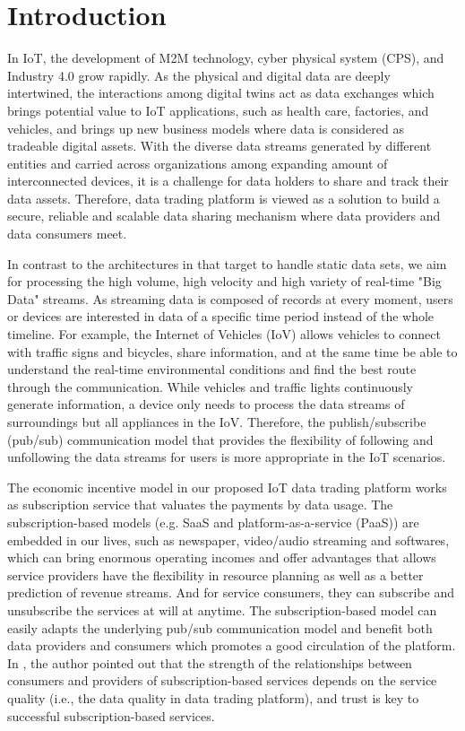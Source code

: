 \documentclass[conference]{IEEEtran}
\begin{document}
\section{Introduction}
In IoT, the development of M2M technology\cite{M2M}, cyber physical system (CPS)\cite{CPS}, and Industry 4.0 grow rapidly. As the physical and digital data are deeply intertwined, the interactions among digital twins act as data exchanges\cite{digitaltwin} which brings potential value to IoT applications, such as health care\cite{healthCare}, factories, and vehicles\cite{AutonomousDriving}, and brings up new business models where data is considered as tradeable digital assets. With the diverse data streams generated by different entities and carried across organizations among expanding amount of interconnected devices, it is a challenge for data holders to share and track their data assets. Therefore, data trading platform is viewed as a solution to build a secure, reliable and scalable data sharing mechanism where data providers and data consumers meet.

In contrast to the architectures in \cite{DIaas, MARSA} that target to handle static data sets, we aim for processing the high volume, high velocity and high variety of real-time "Big Data" streams\cite{BigData}. As streaming data is composed of records at every moment, users or devices are interested in data of a specific time period instead of the whole timeline. For example, the Internet of Vehicles (IoV) allows vehicles to connect with traffic signs and bicycles, share information, and at the same time be able to understand the real-time environmental conditions and find the best route through the communication. While vehicles and traffic lights continuously generate information, a device only needs to process the data streams of surroundings but all appliances in the IoV. Therefore, the publish/subscribe (pub/sub) communication model that provides the flexibility of following and unfollowing the data streams for users is more appropriate in the IoT scenarios.

The economic incentive model in our proposed IoT data trading platform works as subscription service that valuates the payments by data usage. The subscription-based models (e.g. SaaS and platform-as-a-service (PaaS)) are embedded in our lives, such as newspaper, video/audio streaming and softwares, which can bring enormous operating incomes and offer advantages that allows service providers have the flexibility in resource planning as well as a better prediction of revenue streams. And for service consumers, they can subscribe and unsubscribe the services at will at anytime. The subscription-based model can easily adapts the underlying pub/sub communication model and benefit both data providers and consumers which promotes a good circulation of the platform. In \cite{SaaS}, the author pointed out that the strength of the relationships between consumers and providers of subscription-based services depends on the service quality (i.e., the data quality in data trading platform), and trust is key to successful subscription-based services.
\end{document}
